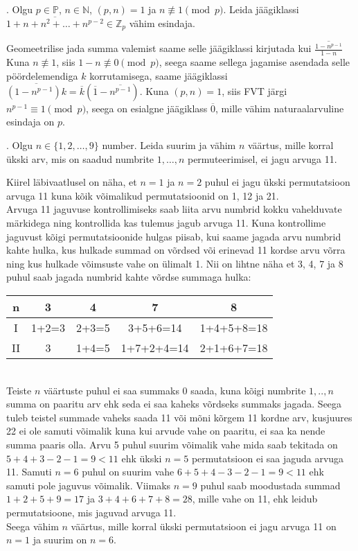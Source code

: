 \documentclass[a4paper, 10pt]{article}
\newcommand{\Z}{\mathbb{Z}}
\newcommand{\N}{\mathbb{N}}
\newcommand{\B}{\mathbb{P}}
\begin{document}
. Olgu $p\in\B$, $n\in\N$, $(p,n)=1$ ja $n\not\equiv 1\pmod{p}$. Leida jäägiklassi $\overline{1+n+n^2+\ldots+n^{p-2}}\in\Z_p$ vähim esindaja. 


\bigskip
Geomeetrilise jada summa valemist saame selle jäägiklassi kirjutada kui $\overline{\frac{1-n^{p-1}}{1-n}}$ Kuna $n\not\equiv 1$, siis $1-n\not\equiv 0 \pmod{p}$, seega saame sellega jagamise asendada selle pöördelemendiga $k$ korrutamisega, saame jäägiklassi $\overline{(1-n^{p-1})k}=\overline{k}(\overline{1}-\overline{n^{p-1}})$. Kuna $(p,n)=1$, siis FVT järgi $n^{p-1}\equiv 1\pmod{p}$, seega on esialgne jäägiklass $\overline{0}$, mille vähim naturaalarvuline esindaja on $p$. 
\bigskip

. Olgu $n\in\{1,2,\ldots,9\}$ number. Leida suurim ja vähim $n$ väärtus, mille korral ükski arv, mis on saadud numbrite $1,\ldots,n$ permuteerimisel, ei jagu arvuga 11. 

\bigskip
Kiirel läbivaatlusel on näha, et $n=1$ ja $n=2$ puhul ei jagu ükski permutatsioon arvuga 11 kuna kõik võimalikud permutatsioonid on 1, 12 ja 21.\\
Arvuga 11 jaguvuse kontrollimiseks saab liita arvu numbrid kokku vahelduvate märkidega ning kontrollida kas tulemus jagub arvuga 11. Kuna kontrollime jaguvust kõigi permutatsioonide hulgas piisab, kui saame jagada arvu numbrid kahte hulka, kus hulkade summad on võrdsed või erinevad 11 kordse arvu võrra ning kus hulkade võimsuste vahe on ülimalt 1. Nii on lihtne näha et 3, 4, 7 ja 8 puhul saab jagada numbrid kahte võrdse summaga hulka:\\
\begin{tabular}{c|c|c|c|c}
n&3&4&7&8\\
\hline
I&1+2=3&2+3=5&3+5+6=14&1+4+5+8=18\\
II&3&1+4=5&1+7+2+4=14&2+1+6+7=18
\end{tabular}\\
Teiste $n$ väärtuste puhul ei saa summaks 0 saada, kuna kõigi numbrite $1,..,n$ summa on paaritu arv ehk seda ei saa kaheks võrdseks summaks jagada. Seega tuleb teistel summade vaheks saada 11 või mõni kõrgem 11 kordne arv, kusjuures 22 ei ole samuti võimalik kuna kui arvude vahe on paaritu, ei saa ka nende summa paaris olla. Arvu 5 puhul suurim võimalik vahe mida saab tekitada on $5+4+3-2-1=9<11$ ehk ükski $n=5$ permutatsioon ei saa jaguda arvuga 11. Samuti $n=6$ puhul on suurim vahe $6+5+4-3-2-1=9<11$ ehk samuti pole jaguvus võimalik. Viimaks $n=9$ puhul saab moodustada summad $1+2+5+9=17$ ja $3+4+6+7+8=28$, mille vahe on 11, ehk leidub permutatsioone, mis jaguvad arvuga 11.\\
Seega vähim $n$ väärtus, mille korral ükski permutatsioon ei jagu arvuga 11 on $n=1$ ja suurim on $n=6$.
\bigskip
\pagebreak
\end{document}
